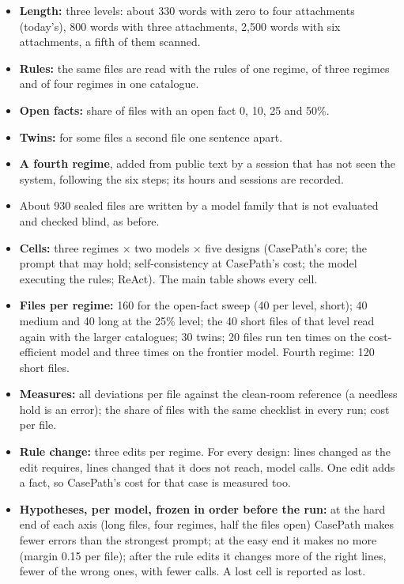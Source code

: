 \documentclass[10pt]{article}
\newcommand{\sect}[1]{\needspace{5\baselineskip}\vspace{3pt}{\bfseries #1\par}\vspace{1pt}}
\begin{document}
{\sect{3. The benchmark, extended (no credits)}
\begin{itemize}
\item \textbf{Length:} three levels: about 330 words with zero to four attachments (today's), 800 words with three attachments, 2,500 words with six attachments, a fifth of them scanned.
\item \textbf{Rules:} the same files are read with the rules of one regime, of three regimes and of four regimes in one catalogue.
\item \textbf{Open facts:} share of files with an open fact 0, 10, 25 and 50\%.
\item \textbf{Twins:} for some files a second file one sentence apart.
\item \textbf{A fourth regime}, added from public text by a session that has not seen the system, following the six steps; its hours and sessions are recorded.
\item About 930 sealed files are written by a model family that is not evaluated and checked blind, as before.
\end{itemize}
\sect{4. Study 4 (one registered test, after a freeze with an external timestamp)}
\begin{itemize}
\item \textbf{Cells:} three regimes × two models × five designs (CasePath's core; the prompt that may hold; self-consistency at CasePath's cost; the model executing the rules; ReAct). The main table shows every cell.
\item \textbf{Files per regime:} 160 for the open-fact sweep (40 per level, short); 40 medium and 40 long at the 25\% level; the 40 short files of that level read again with the larger catalogues; 30 twins; 20 files run ten times on the cost-efficient model and three times on the frontier model. Fourth regime: 120 short files.
\item \textbf{Measures:} all deviations per file against the clean-room reference (a needless hold is an error); the share of files with the same checklist in every run; cost per file.
\item \textbf{Rule change:} three edits per regime. For every design: lines changed as the edit requires, lines changed that it does not reach, model calls. One edit adds a fact, so CasePath's cost for that case is measured too.
\item \textbf{Hypotheses, per model, frozen in order before the run:} at the hard end of each axis (long files, four regimes, half the files open) CasePath makes fewer errors than the strongest prompt; at the easy end it makes no more (margin 0.15 per file); after the rule edits it changes more of the right lines, fewer of the wrong ones, with fewer calls. A lost cell is reported as lost.

\end{itemize}}
\end{document}
